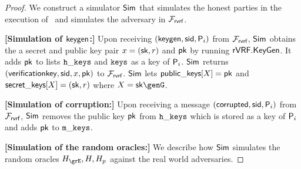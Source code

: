 \begin{proof}
	We construct a simulator $ \mathsf{Sim} $ that simulates the honest parties in the execution of \name \ and simulates the adversary in $ \mathcal{F}_{\textsf{rvrf}} $. 
	
		
		 \noindent\textbf{[Simulation of $ \mathsf{keygen} $:]} Upon receiving $(\mathsf{keygen}, \textsf{sid}, \mathsf{P}_i)$ from $\mathcal{F}_{\textsf{rvrf}}$, $ \mathsf{Sim} $ obtains the a secret and public key pair $ x = (\mathsf{sk},r)$ and $\mathsf{pk} $ by running $ {\mathsf{rVRF}}.{\mathsf{KeyGen}} $. It adds $ \mathsf{pk} $ to lists $ \mathtt{h\_keys} $ and $ \texttt{keys} $ as a key of $ \mathsf{P}_i $. 
		 $ \mathsf{Sim} $ returns $(\mathsf{verificationkey}, \textsf{sid}, x,\mathsf{pk})$ to $\mathcal{F}_{\textsf{rvrf}}$. 
		$ \mathsf{Sim} $ lets  $ {\mathsf{public\_keys}}[X] = \mathsf{pk}$ and $ {\mathsf{secret\_keys}}[X] =(\mathsf{sk},r) $ where $ X = \sk \genG $.
		
		 \noindent\textbf{[Simulation of corruption:]} Upon receiving a message $ (\mathsf{corrupted}, \textsf{sid}, \mathsf{P}_i) $ from $ \mathcal{F}_{\textsf{rvrf}} $, $ \mathsf{Sim} $ removes the public key $ \mathsf{pk} $ from $ \mathtt{h\_keys} $ which is stored as a key of $ \mathsf{P}_i $ and adds $ \mathsf{pk} $ to $ \mathtt{m\_keys} $.
		
		\noindent\textbf{[Simulation of the random oracles:]} We  describe how $ \mathsf{Sim} $ simulates the random oracles $ \hashG, \hash, \hash_p $ against the real world adversaries. 	
		

\end{proof}
